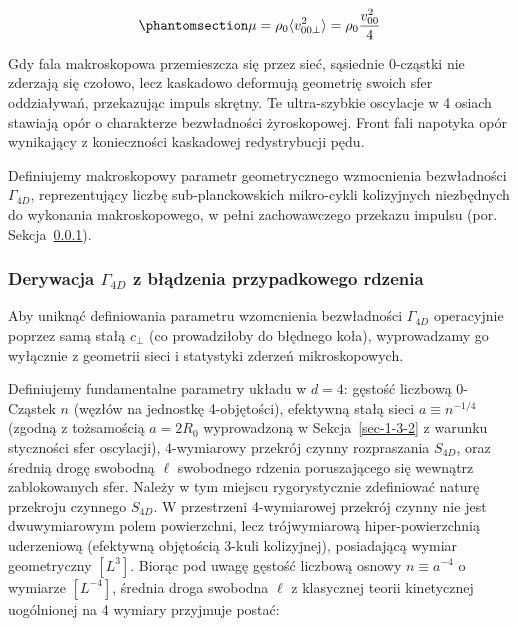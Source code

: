 \documentclass[
  polish,
  letterpaper,
  DIV=11,
  numbers=noendperiod,
  oneside]{scrartcl}
\begin{document}
\begin{equation}\protect\phantomsection\label{eq-sek1-3-mod-sprez}{\mu = \rho_0 \langle v_{\text{00}\perp}^2 \rangle = \rho_0 \frac{v_{\text{00}}^2}{4}}\end{equation}

Gdy fala makroskopowa przemieszcza się przez sieć, sąsiednie 0-cząstki
nie zderzają się czołowo, lecz kaskadowo deformują geometrię swoich sfer
oddziaływań, przekazując impuls skrętny. Te ultra-szybkie oscylacje w 4
osiach stawiają opór o charakterze bezwładności żyroskopowej. Front fali
napotyka opór wynikający z konieczności kaskadowej redystrybucji pędu.

Definiujemy makroskopowy parametr geometrycznego wzmocnienia
bezwładności \(\Gamma_{4D}\), reprezentujący liczbę sub-planckowskich
mikro-cykli kolizyjnych niezbędnych do wykonania makroskopowego, w pełni
zachowawczego przekazu impulsu (por. Sekcja~\ref{sec-1-3-3}).

\subsubsection{\texorpdfstring{Derywacja \(\Gamma_{4D}\) z błądzenia
przypadkowego
rdzenia}{Derywacja \textbackslash Gamma\_\{4D\} z błądzenia przypadkowego rdzenia}}\label{sec-1-3-3}

Aby uniknąć definiowania parametru wzomcnienia bezwładności
\(\Gamma_{4D}\) operacyjnie poprzez samą stałą \(c_\perp\) (co
prowadziłoby do błędnego koła), wyprowadzamy go wyłącznie z geometrii
sieci i statystyki zderzeń mikroskopowych.

Definiujemy fundamentalne parametry układu w \(d=4\): gęstość liczbową
0-Cząstek \(n\) (węzłów na jednostkę 4-objętości), efektywną stałą sieci
\(a \equiv n^{-1/4}\) (zgodną z tożsamością \(a=2R_0\) wyprowadzoną w
Sekcja~\ref{sec-1-3-2} z warunku styczności sfer oscylacji), 4-wymiarowy
przekrój czynny rozpraszania \(S_{4D}\), oraz średnią drogę swobodną
\(\ell\) swobodnego rdzenia poruszającego się wewnątrz zablokowanych
sfer. Należy w tym miejscu rygorystycznie zdefiniować naturę przekroju
czynnego \(S_{4D}\). W przestrzeni 4-wymiarowej przekrój czynny nie jest
dwuwymiarowym polem powierzchni, lecz trójwymiarową hiper-powierzchnią
uderzeniową (efektywną objętością 3-kuli kolizyjnej), posiadającą wymiar
geometryczny \([L^3]\). Biorąc pod uwagę gęstość liczbową osnowy
\(n \equiv a^{-4}\) o wymiarze \([L^{-4}]\), średnia droga swobodna
\(\ell\) z klasycznej teorii kinetycznej uogólnionej na 4 wymiary
przyjmuje postać:
\end{document}
